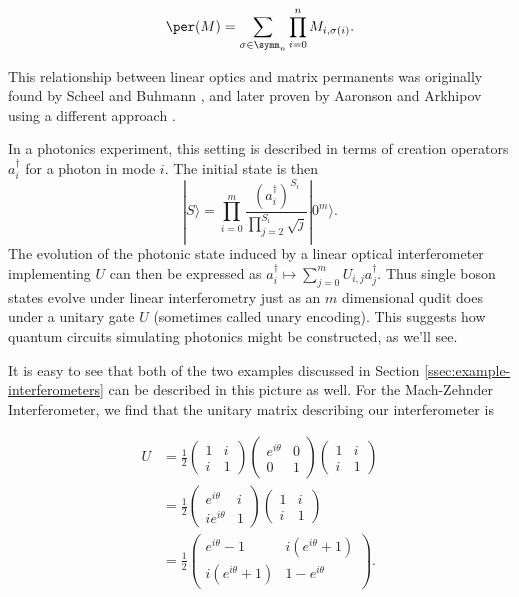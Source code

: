 \begin{equation}
\per(M) = \sum_{\sigma\in\symm_n}\prod_{i=0}^nM_{i,\sigma(i)}.
\label{eqn:permanent}
\end{equation}

This relationship between linear optics and matrix permanents was originally found by Scheel and Buhmann \cite{scheel2008}, and later proven by Aaronson and Arkhipov using a different approach \cite{aaronson2010report, aaronson2011}.

In a photonics experiment, this setting is described in terms of creation operators $a^\dag_i$ for a photon in mode $i$. 
The initial state is then
\begin{equation}
|S\rangle = \prod_{i=0}^m \frac{(a_i^\dagger)^{S_i}}{\prod_{j=2}^{S_i}\sqrt{j}}|0^m\rangle.
\end{equation}
The evolution of the photonic state induced by a linear optical interferometer implementing $U$ can then be expressed as $a_i^\dagger \mapsto \sum_{j = 0}^m U_{i,j}a_j^\dagger$.
Thus single boson states evolve under linear interferometry just as an $m$ dimensional qudit does under a unitary gate $U$ (sometimes called unary encoding).
This suggests how quantum circuits simulating photonics might be constructed, as we'll see.

It is easy to see that both of the two examples discussed in Section \ref{ssec:example-interferometers} can be described in this picture as well. For the Mach-Zehnder Interferometer, we find that the unitary matrix describing our interferometer is

\begin{align}
U &= \frac{1}{2}\begin{pmatrix}1&i\\i&1\end{pmatrix}\begin{pmatrix}e^{i\theta}&0\\0&1\end{pmatrix}\begin{pmatrix}1&i\\i&1\end{pmatrix}\\
&= \frac{1}{2}\begin{pmatrix}e^{i\theta}&i\\ie^{i\theta}&1\end{pmatrix}\begin{pmatrix}1&i\\i&1\end{pmatrix}\\
&= \frac{1}{2}\begin{pmatrix}e^{i\theta}-1&i(e^{i\theta}+1)\\i(e^{i\theta}+1)&1-e^{i\theta}\end{pmatrix}.
\end{align}

